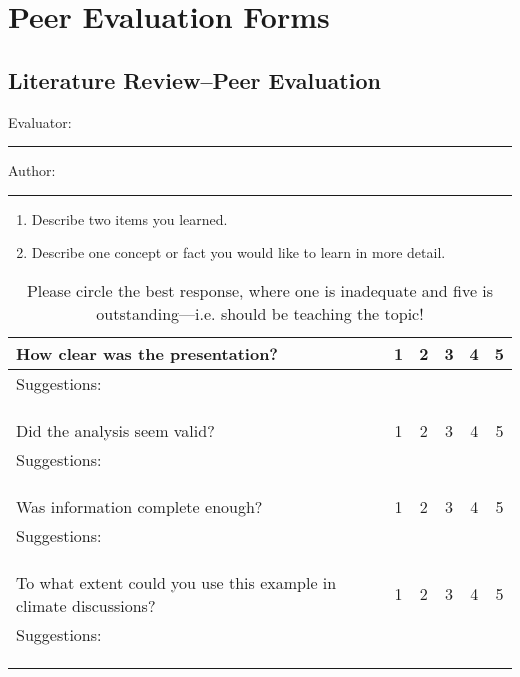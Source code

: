 \documentclass{article}\usepackage[]{graphicx}\usepackage[]{color}
\begin{document}
\clearpage
\newpage
\section{Peer Evaluation Forms}

\subsection{Literature Review--Peer Evaluation}

\bigskip
Evaluator: \rule{7cm}{0.4pt}

\bigskip

\noindent Author: \rule{7cm}{0.4pt}

\begin{enumerate}
 \setlength\itemsep{4em}
  \item Describe two items you learned.
  \item Describe one concept or fact you would like to learn in more detail.
\end{enumerate}


\begin{table}[ht!]
\caption{Please circle the best response, where one is inadequate and five is outstanding---i.e. should be teaching the topic!}
\begin{tabular}{|p{4in}|ccccc|}\hline
How clear was the presentation?     & 1 & 2 & 3 & 4 & 5 \\ \hline
Suggestions: &&&&& \\ &&&&& \\ &&&&& \\
&&&&& \\ \hline
Did the analysis seem valid?        & 1 & 2 & 3 & 4 & 5 \\ \hline
Suggestions: &&&&& \\ &&&&& \\ &&&&& \\
&&&&& \\ \hline
Was information complete enough?            & 1 & 2 & 3 & 4 & 5 \\ \hline
Suggestions: &&&&& \\ &&&&& \\ &&&&& \\
&&&&& \\ \hline
To what extent could you use this example in climate discussions?            & 1 & 2 & 3 & 4 & 5 \\ \hline
Suggestions: &&&&& \\ &&&&& \\ &&&&& \\
&&&&& \\ \hline
\end{tabular}
\end{table}
\end{document}
